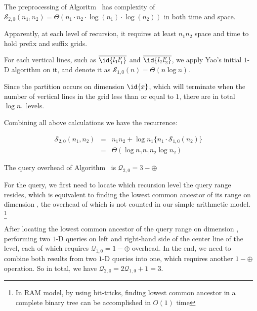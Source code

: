 \begin{theorem}
The preprocessing of Algoritm~ has complexity of
$\mathcal{S}_{2, 0}(n_1, n_2) = \Theta(n_1 \cdot n_2 \cdot \log (n_1)
\cdot \log(n_2))$ in both time and space.
\label{thm:init-2D-pp}
\end{theorem}

\begin{IEEEproof}
Apparently, at each level of recursion, it requires at least $n_1
n_2$ space and time to hold prefix and suffix grids.

For each vertical lines, such as $\overline{\id{l_1l_1'}}$ and
$\overline{\id{l_2l_2'}}$, we apply Yao's initial $1$-D algorithm on it, and
denote it as $\mathcal{S}_{1, 0}(n) = \Theta(n \log n)$. 

Since the partition occurs on dimension $\id{x}$, which will terminate
when the number of vertical lines in the grid less than or equal to $1$,
there are in total $\log n_1$ levels.

Combining all above calculations we have the recurrence:

\begin{eqnarray}
\mathcal{S}_{2, 0} (n_1, n_2) & = & n_1 n_2 + \log n_1 \{ n_1 \cdot \mathcal{S}_{1, 0}(n_2)\} \\
    & = & \Theta(\log n_1 n_1 n_2 \log n_2)
\label{eq:init-2D-S20}
\end{eqnarray}
\end{IEEEproof}

\begin{corollary}
The query overhead of Algorithm~ is 
$\mathcal{Q}_{2, 0} = 3-\oplus$
\label{cor:init-2D-query}
\end{corollary}

\begin{IEEEproof}
For the query, we first need to locate which recursion level the query
range resides, which is equivalent to finding the lowest common ancestor
of its range on dimension , the overhead of which is not counted
in our simple arithmetic model.
\footnote{In RAM model, by using bit-tricks, finding lowest common
ancestor in a complete binary tree can be accomplished in $O(1)$ time} 

After locating the lowest common ancestor of the query range on dimension
, performing two $1$-D queries on left and right-hand side of
the center line of the level, each of which requires 
$\mathcal{Q}_{1, 0} = 1-\oplus$
overhead. In the end, we need to combine both results from two $1$-D
queries into one, which requires another $1-\oplus$ operation. So in
total, we have $\mathcal{Q}_{2, 0} = 2 \mathcal{Q}_{1, 0} + 1 = 3$.
\end{IEEEproof}

